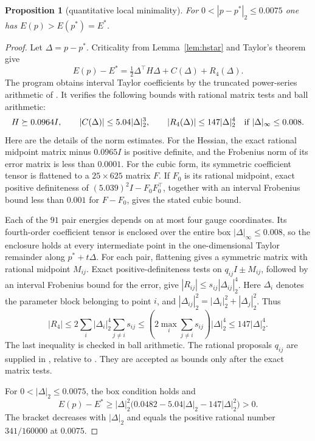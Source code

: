 \documentclass[11pt]{article}
\newtheorem{proposition}[theorem]{Proposition}
\theoremstyle{definition}
\newcommand{\Es}{E^{\ast}}
\begin{document}
\begin{proposition}[quantitative local minimality]\label{prop:local}
For $0<|p-p^\ast|_2\le 0.0075$ one has $E(p)>E(p^\ast)=\Es$.
\end{proposition}
\begin{proof}
Let $\Delta=p-p^\ast$. Criticality from Lemma~\ref{lem:hstar} and Taylor's theorem give
\[
 E(p)-\Es=\tfrac12\Delta^\top H\Delta+C(\Delta)+R_4(\Delta).
\]
The program  obtains interval Taylor coefficients by the truncated power-series arithmetic
of . It verifies the following bounds with rational matrix tests and ball arithmetic:
\[
 H\succeq0.0964I,\qquad |C(\Delta)|\le5.04|\Delta|_2^3,
 \qquad |R_4(\Delta)|\le147|\Delta|_2^4
 \quad\hbox{if }|\Delta|_\infty\le0.008.
\]
Here are the details of the norm estimates. For the Hessian, the exact rational midpoint matrix minus $0.0965I$
is positive definite, and the Frobenius norm of its error matrix is less than $0.0001$.
For the cubic form, its symmetric coefficient tensor is flattened to a $25\times625$ matrix $F$.
If $F_0$ is its rational midpoint, exact positive definiteness of
$(5.039)^2I-F_0F_0^\top$, together with an interval Frobenius bound less than $0.001$ for $F-F_0$,
gives the stated cubic bound.

Each of the $91$ pair energies depends on at most four gauge coordinates. Its fourth-order coefficient tensor is
enclosed over the entire box $|\Delta|_\infty\le0.008$, so the enclosure holds at every intermediate point in the
one-dimensional Taylor remainder along $p^\ast+t\Delta$.
For each pair, flattening gives a symmetric matrix with rational midpoint $M_{ij}$.
Exact positive-definiteness tests on $q_{ij}I\pm M_{ij}$, followed by an interval Frobenius bound for the error,
give $|R_{ij}|\le s_{ij}|\Delta_{ij}|_2^4$.
Here $\Delta_i$ denotes the parameter block belonging to point $i$, and
$|\Delta_{ij}|_2^2=|\Delta_i|_2^2+|\Delta_j|_2^2$.
Thus
\[
 |R_4|\le2\sum_i |\Delta_i|_2^4\sum_{j\ne i}s_{ij}
 \le\left(2\max_i\sum_{j\ne i}s_{ij}\right)|\Delta|_2^4
 \le147|\Delta|_2^4.
\]
The last inequality is checked in ball arithmetic. The rational proposals $q_{ij}$ are supplied in
, relative to .
They are accepted as bounds only after the exact matrix tests.

For $0<|\Delta|_2\le0.0075$, the box condition holds and
\[
 E(p)-\Es\ge |\Delta|_2^2
 \bigl(0.0482-5.04|\Delta|_2-147|\Delta|_2^2\bigr)>0.
\]
The bracket decreases with $|\Delta|_2$ and equals the positive rational number $341/160000$ at $0.0075$.
\end{proof}
\end{document}
